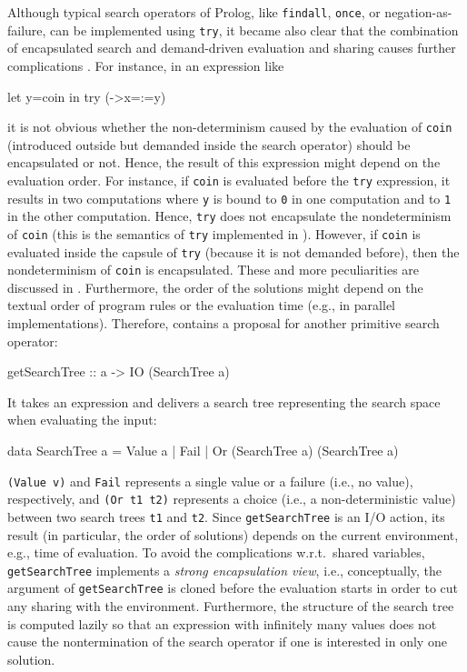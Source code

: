\documentclass[english]{lni}
\newcommand{\code}[1]{\texttt{\small{}#1}}
\begin{document}
Although typical search operators of Prolog,
like \code{findall}, \code{once}, or negation-as-failure,
can be implemented using \code{try},
it became also clear that the combination of
encapsulated search and demand-driven evaluation
and sharing causes further complications \cite{BrasselHanusHuch04JFLP}.
For instance, in an expression like
\begin{curry}
let y=coin in try (\x->x=:=y)
\end{curry}
it is not obvious whether the non-determinism caused by the evaluation
of \code{coin} (introduced outside
but demanded inside the search operator) should be encapsulated or not.
Hence, the result of this expression might depend on the evaluation order.
For instance,
if \code{coin} is evaluated before the \code{try} expression,
it results in two computations where \code{y} is bound to \code{0}
in one computation and to \code{1} in the other computation.
Hence, \code{try} does not encapsulate the nondeterminism of \code{coin}
(this is the semantics of \code{try} implemented in \cite{Lux99FLOPS}).
However, if \code{coin} is evaluated inside the capsule of \code{try}
(because it is not demanded before), then the nondeterminism of
\code{coin} is encapsulated.
These and more peculiarities are discussed in \cite{BrasselHanusHuch04JFLP}.
Furthermore, the order of the solutions might depend on the
textual order of program rules or the evaluation time
(e.g., in parallel implementations).
Therefore, \cite{BrasselHanusHuch04JFLP} contains a proposal
for another primitive search operator:
\begin{curry}
getSearchTree :: a -> IO (SearchTree a)
\end{curry}
It takes an expression and delivers a search tree representing
the search space when evaluating the input:
\begin{curry}
data SearchTree a = Value a | Fail | Or (SearchTree a) (SearchTree a)
\end{curry}
\code{(Value v)} and \code{Fail} represents a single value
or a failure (i.e., no value), respectively,
and \code{(Or t1 t2)} represents a choice (i.e., a non-deterministic value)
between two search trees \code{t1} and \code{t2}.
Since \code{getSearchTree} is an I/O action, its result (in particular,
the order of solutions) depends on the current environment, e.g.,
time of evaluation.
To avoid the complications w.r.t.\ shared variables,
\code{getSearchTree} implements a \emph{strong encapsulation view},
i.e., conceptually, the argument of \code{getSearchTree}
is cloned before the evaluation starts in order to cut any sharing
with the environment.
Furthermore, the structure of the search tree is computed lazily
so that an expression with infinitely many values does not cause
the nontermination of the search operator if one is interested in only
one solution.
\end{document}
